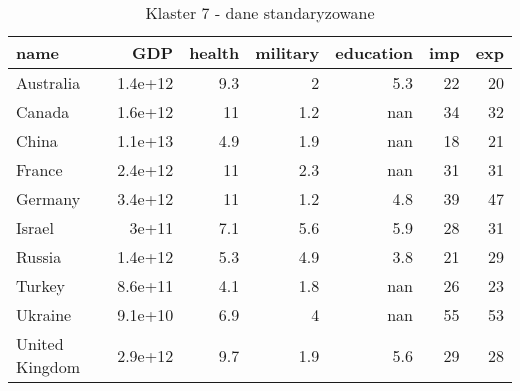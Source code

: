 \begin{table}
    \centering
    \caption{Klaster 7 - dane standaryzowane}
    \label{tab:cl7std}
    \begin{tabular}{lrrrrrr}
        \toprule
        name           & GDP     & health & military & education & imp & exp \\
        \midrule
        Australia      & 1.4e+12 & 9.3    & 2        & 5.3       & 22  & 20  \\
        Canada         & 1.6e+12 & 11     & 1.2      & nan       & 34  & 32  \\
        China          & 1.1e+13 & 4.9    & 1.9      & nan       & 18  & 21  \\
        France         & 2.4e+12 & 11     & 2.3      & nan       & 31  & 31  \\
        Germany        & 3.4e+12 & 11     & 1.2      & 4.8       & 39  & 47  \\
        Israel         & 3e+11   & 7.1    & 5.6      & 5.9       & 28  & 31  \\
        Russia         & 1.4e+12 & 5.3    & 4.9      & 3.8       & 21  & 29  \\
        Turkey         & 8.6e+11 & 4.1    & 1.8      & nan       & 26  & 23  \\
        Ukraine        & 9.1e+10 & 6.9    & 4        & nan       & 55  & 53  \\
        United Kingdom & 2.9e+12 & 9.7    & 1.9      & 5.6       & 29  & 28  \\
        \bottomrule
    \end{tabular}
\end{table}
